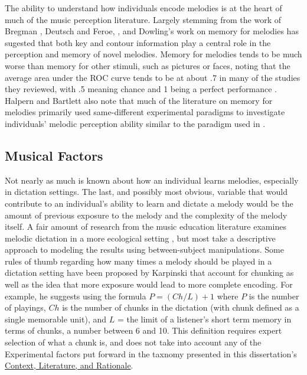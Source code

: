 \documentclass[12pt,]{book}
\begin{document}
The ability to understand how individuals encode melodies is at the heart of much of the music perception literature.
Largely stemming from the work of Bregman \citep{bregmanAuditorySceneAnalysis2006}, Deutsch and Feroe, \citep{deutschInternalRepresentationPitch1981}, and Dowling's \citep{bartlettRecognitionTransposedMelodies1980, dowlingExpectancyAttentionMelody1990, dowlingPerceptionInterleavedMelodies1973, dowlingScaleContourTwo1978} work on memory for melodies has sugested that both key and contour information play a central role in the perception and memory of novel melodies.
Memory for melodies tends to be much worse than memory for other stimuli, such as pictures or faces, noting that the average area under the ROC curve tends to be at about .7 in many of the studies they reviewed, with .5 meaning chance and 1 being a perfect performance \citep{halpernMemoryMelodies2010}.
Halpern and Bartlett also note that much of the literature on memory for melodies primarily used same-different experimental paradigms to investigate individuals' melodic perception ability similar to the paradigm used in \citep{halpernEffectsTimbreTempo2008}.

\hypertarget{musical-factors-1}{%
\subsection{Musical Factors}\label{musical-factors-1}}

Not nearly as much is known about how an individual learns melodies, especially in dictation settings.
The last, and possibly most obvious, variable that would contribute to an individual's ability to learn and dictate a melody would be the amount of previous exposure to the melody and the complexity of the melody itself.
A fair amount of research from the music education literature examines melodic dictation in a more ecological setting \citep{buonviriEffectsMusicNotation2015, buonviriEffectsPreparatorySinging2015, buonviriEffectsTwoListening2017, buonviriExplorationUndergraduateMusic2014, buonviriMelodicDictationInstruction2015, unsworthAutomatedVersionOperation2005}, but most take a descriptive approach to modeling the results using between-subject manipulations.
Some rules of thumb regarding how many times a melody should be played in a dictation setting have been proposed by Karpinski \citep[p.99]{karpinskiAuralSkillsAcquisition2000} that account for chunking as well as the idea that more exposure would lead to more complete encoding.
For example, he suggests using the formula \(P = (Ch/L) + 1\) where \(P\) is the number of playings, \(Ch\) is the number of chunks in the dictation (with chunk defined as a single memorable unit), and \(L\) = the limit of a listener's short term memory in terms of chunks, a number between 6 and 10.
This definition requires expert selection of what a chunk is, and does not take into account any of the Experimental factors put forward in the taxnomy presented in this dissertation's \protect\hyperlink{intro}{Context, Literature, and Rationale}.
\end{document}
